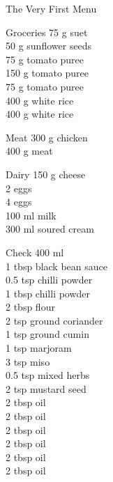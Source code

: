 \begin{menu}{The Very First Menu}
\begin{shoppinglist}{Groceries}
      75 g suet \\ 
      50 g sunflower seeds \\ 
      75 g tomato puree \\ 
      150 g tomato puree \\ 
      75 g tomato puree \\ 
      400 g white rice \\ 
      400 g white rice \\ 
      \end{shoppinglist}%
      \par\vfil %
      \begin{shoppinglist}{Meat}
      300 g chicken \\ 
      400 g meat \\ 
      \end{shoppinglist}%
      \begin{shoppinglist}{Dairy}
      150 g cheese \\ 
      2  eggs \\ 
      4  eggs \\ 
      100 ml milk \\ 
      300 ml soured cream \\ 
      \end{shoppinglist}%
      \par\vfil %
      \vfil\clearpage %
      \begin{shoppinglist}{Check}
      400 ml  \\ 
      1 tbsp black bean sauce \\ 
      0.5 tsp chilli powder \\ 
      1 tbsp chilli powder \\ 
      2 tbsp flour \\ 
      2 tsp ground coriander \\ 
      1 tsp ground cumin \\ 
      1 tsp marjoram \\ 
      3 tsp miso \\ 
      0.5 tsp mixed herbs \\ 
      2 tsp mustard seed \\ 
      2 tbsp oil \\ 
      2 tbsp oil \\ 
      2 tbsp oil \\ 
      2 tbsp oil \\ 
      2 tbsp oil \\ 
      2 tbsp oil \\ 

\end{shoppinglist}
\end{menu}

